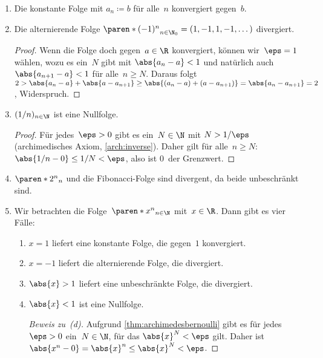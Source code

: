 \documentclass[a4paper]{article}
\begin{document}
\begin{example}\leavevmode
    \begin{enumerate}
        \item Die konstante Folge mit $a_n \coloneqq b$ für alle~$n$ konvergiert gegen~$b$.
        \item Die alternierende Folge $\paren*{(-1)^n}_{n \in \N_0} = (1, -1, 1, -1, \dots)$ divergiert.
              \begin{proof}
                  Wenn die Folge doch gegen~$a \in \R$ konvergiert, können wir~$\eps = 1$ wählen, wozu es ein~$N$ gibt mit $\abs{a_n-a} < 1$ und natürlich auch $\abs{a_{n+1}-a} < 1$ für alle~$n \geq N$. Daraus folgt $2 > \abs{a_n-a} + \abs{a-a_{n+1}} \geq \abs{(a_n-a) + (a-a_{n+1})} = \abs{a_n-a_{n+1}} = 2$, Widerspruch.
              \end{proof}
        \item $(1/n)_{n \in \N}$ ist eine Nullfolge.
              \begin{proof}
                  Für jedes~$\eps > 0$ gibt es ein~$N \in \N$ mit $N > 1/\eps$ (archimedisches Axiom, \cref{arch:inverse}). Daher gilt für alle~$n \geq N$: $\abs{1/n-0} \leq 1/N < \eps$, also ist $0$~der Grenzwert.
              \end{proof}
        \item $\paren*{2^n}_n$ und die Fibonacci-Folge sind divergent, da beide unbeschränkt sind.
        \item Wir betrachten die Folge~$\paren*{x^n}_{n\in\N}$ mit~$x \in \R$. Dann gibt es vier Fälle:
              \begin{enumerate}
                  \item $x = 1$ liefert eine konstante Folge, die gegen~$1$ konvergiert.
                  \item $x = -1$ liefert die alternierende Folge, die divergiert.
                  \item $\abs{x} > 1$ liefert eine unbeschränkte Folge, die divergiert.
                  \item $\abs{x} < 1$ ist eine Nullfolge.
                        \begin{proof}[Beweis zu~(d)]
                            Aufgrund \cref{thm:archimedesbernoulli} gibt es für jedes~$\eps > 0$ ein~$N \in \N$, für das $\abs{x}^N < \eps$ gilt. Daher ist $\abs{x^n-0} = \abs{x}^n \leq \abs{x}^N < \eps$.
                        \end{proof}
              \end{enumerate}
    \end{enumerate}
\end{example}
\end{document}
